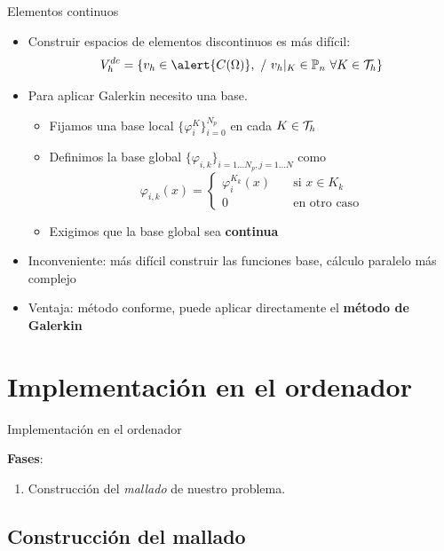 \documentclass[9pt,leqno]{beamer}
\newcommand{\Nt}{N}
\newcommand{\Np}{{N_p}}
\begin{document}
\begin{frame}{Elementos continuos}
  \begin{itemize}
  \item Construir espacios de elementos discontinuos es más difícil:
  $$
  V_h^{dc} = \{ \vh\in \alert{C(\Omega)},\ /\ \vh|_K \in
  \mathbb{P}_n\ \forall K\in\Th\}
  $$
\item
  Para aplicar Galerkin necesito una base.
  \begin{itemize}
  \item Fijamos una base local $\{\varphi_i^K\}_{i=0}^{\Np}$ en cada
    $K\in {\cal T}_h$
  \item Definimos la base global
    $\{\varphi_{i,k}\}_{i=1...\Np, j=1...\Nt}$ como
    \begin{equation*}
      \varphi_{i,k}(x) = \left\{
        \begin{aligned}
          \varphi_i^{K_k} (x) &\quad \text{si } x\in K_k \\
          0 &\quad \text{en otro caso}
        \end{aligned}
      \right.
    \end{equation*}
  \item \alert{Exigimos que la base global sea \textbf{continua}}
  \end{itemize}
\item Inconveniente:  más difícil construir las funciones base, cálculo paralelo más complejo
\item Ventaja: método conforme, puede aplicar directamente el
  \textbf{método de Galerkin}
\end{itemize}
\end{frame}

\section{Implementación en el ordenador}

\begin{frame}{Implementación en el ordenador}
	
	{\large \textbf{Fases}}:
	\bigskip
	\begin{enumerate}\itemsep1em
		\item Construcción del \alert{\textit{mallado}} de nuestro problema.
	\end{enumerate}
\end{frame}

\subsection{Construcción del mallado}


{}
\end{document}
